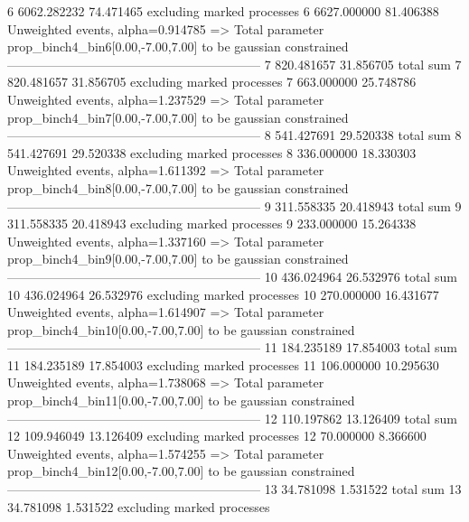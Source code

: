 6          6062.282232     74.471465       excluding marked processes    
6          6627.000000     81.406388       Unweighted events, alpha=0.914785
  => Total parameter prop_binch4_bin6[0.00,-7.00,7.00] to be gaussian constrained
------------------------------------------------------------
7          820.481657      31.856705       total sum                     
7          820.481657      31.856705       excluding marked processes    
7          663.000000      25.748786       Unweighted events, alpha=1.237529
  => Total parameter prop_binch4_bin7[0.00,-7.00,7.00] to be gaussian constrained
------------------------------------------------------------
8          541.427691      29.520338       total sum                     
8          541.427691      29.520338       excluding marked processes    
8          336.000000      18.330303       Unweighted events, alpha=1.611392
  => Total parameter prop_binch4_bin8[0.00,-7.00,7.00] to be gaussian constrained
------------------------------------------------------------
9          311.558335      20.418943       total sum                     
9          311.558335      20.418943       excluding marked processes    
9          233.000000      15.264338       Unweighted events, alpha=1.337160
  => Total parameter prop_binch4_bin9[0.00,-7.00,7.00] to be gaussian constrained
------------------------------------------------------------
10         436.024964      26.532976       total sum                     
10         436.024964      26.532976       excluding marked processes    
10         270.000000      16.431677       Unweighted events, alpha=1.614907
  => Total parameter prop_binch4_bin10[0.00,-7.00,7.00] to be gaussian constrained
------------------------------------------------------------
11         184.235189      17.854003       total sum                     
11         184.235189      17.854003       excluding marked processes    
11         106.000000      10.295630       Unweighted events, alpha=1.738068
  => Total parameter prop_binch4_bin11[0.00,-7.00,7.00] to be gaussian constrained
------------------------------------------------------------
12         110.197862      13.126409       total sum                     
12         109.946049      13.126409       excluding marked processes    
12         70.000000       8.366600        Unweighted events, alpha=1.574255
  => Total parameter prop_binch4_bin12[0.00,-7.00,7.00] to be gaussian constrained
------------------------------------------------------------
13         34.781098       1.531522        total sum                     
13         34.781098       1.531522        excluding marked processes    
